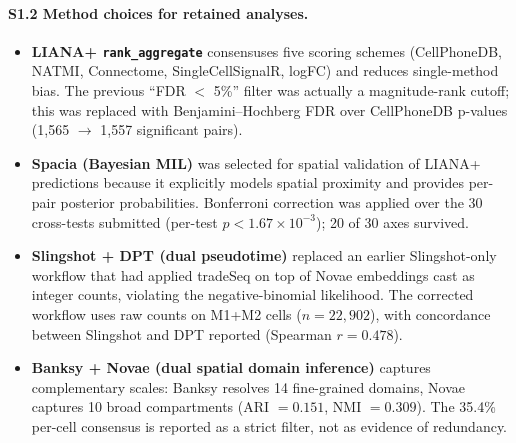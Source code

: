 \documentclass[12pt,a4paper]{article}
\begin{document}
\paragraph{S1.2 Method choices for retained analyses.}
\begin{itemize}
    \item \textbf{LIANA+ \texttt{rank\_aggregate}} consensuses five scoring schemes (CellPhoneDB, NATMI, Connectome, SingleCellSignalR, logFC) and reduces single-method bias. The previous ``FDR $<$ 5\%'' filter was actually a magnitude-rank cutoff; this was replaced with Benjamini--Hochberg FDR over CellPhoneDB p-values (1{,}565 $\to$ 1{,}557 significant pairs).
    \item \textbf{Spacia (Bayesian MIL)} was selected for spatial validation of LIANA+ predictions because it explicitly models spatial proximity and provides per-pair posterior probabilities. Bonferroni correction was applied over the 30 cross-tests submitted (per-test $p < 1.67 \times 10^{-3}$); 20 of 30 axes survived.
    \item \textbf{Slingshot + DPT (dual pseudotime)} replaced an earlier Slingshot-only workflow that had applied tradeSeq on top of Novae embeddings cast as integer counts, violating the negative-binomial likelihood. The corrected workflow uses raw counts on M1+M2 cells ($n=22{,}902$), with concordance between Slingshot and DPT reported (Spearman $r=0.478$).
    \item \textbf{Banksy + Novae (dual spatial domain inference)} captures complementary scales: Banksy resolves 14 fine-grained domains, Novae captures 10 broad compartments (ARI $=0.151$, NMI $=0.309$). The 35.4\% per-cell consensus is reported as a strict filter, not as evidence of redundancy.
\end{itemize}
\end{document}
